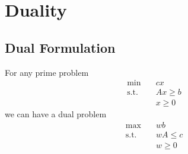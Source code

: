         \section{Duality}
            \subsection{Dual Formulation}
                For any prime problem
                \begin{align}
                    \text{min} \quad & cx \nonumber\\
                    \text{s.t.} \quad & Ax\ge b \nonumber\\
                                & x\ge 0 \nonumber
                \end{align}
                we can have a dual problem
                \begin{align}
                    \text{max} \quad & wb \nonumber \\
                    \text{s.t.} \quad & wA\le c\nonumber\\
                                & w \ge 0\nonumber
                \end{align}
                
